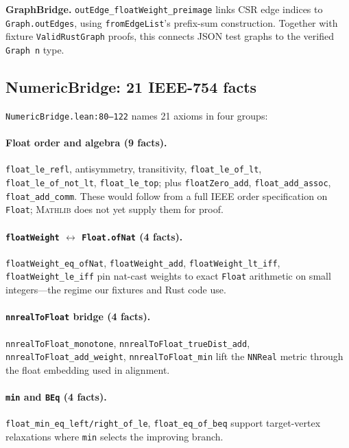 \documentclass[11pt,a4paper]{article}
\newcommand{\Mathlib}{\textsc{Mathlib}\xspace}
\newcommand{\code}[1]{\texttt{#1}}
\theoremstyle{plain}
\theoremstyle{definition}
\begin{document}
\textbf{GraphBridge.} \code{outEdge\_floatWeight\_preimage} links CSR edge
indices to \code{Graph.outEdges}, using \code{fromEdgeList}'s prefix-sum
construction. Together with fixture \code{ValidRustGraph} proofs, this
connects JSON test graphs to the verified \code{Graph n} type.

\subsection{NumericBridge: 21 IEEE-754 facts}\label{sec:refine-numeric}

\code{NumericBridge.lean:80--122} names 21 axioms in four groups:

\paragraph*{Float order and algebra (9 facts).}
\code{float\_le\_refl}, antisymmetry, transitivity, \code{float\_le\_of\_lt},
\code{float\_le\_of\_not\_lt}, \code{float\_le\_top}; plus
\code{floatZero\_add}, \code{float\_add\_assoc}, \code{float\_add\_comm}.
These would follow from a full IEEE order specification on \code{Float};
\Mathlib{} does not yet supply them for proof.

\paragraph*{\code{floatWeight} $\leftrightarrow$ \code{Float.ofNat} (4 facts).}
\code{floatWeight\_eq\_ofNat}, \code{floatWeight\_add},
\code{floatWeight\_lt\_iff}, \code{floatWeight\_le\_iff} pin nat-cast
weights to exact \code{Float} arithmetic on small integers---the regime our
fixtures and Rust code use.

\paragraph*{\code{nnrealToFloat} bridge (4 facts).}
\code{nnrealToFloat\_monotone}, \code{nnrealToFloat\_trueDist\_add},
\code{nnrealToFloat\_add\_weight}, \code{nnrealToFloat\_min} lift the
\code{NNReal} metric through the float embedding used in alignment.

\paragraph*{\code{min} and \code{BEq} (4 facts).}
\code{float\_min\_eq\_left/right\_of\_le}, \code{float\_eq\_of\_beq} support
target-vertex relaxations where \code{min} selects the improving branch.
\end{document}
